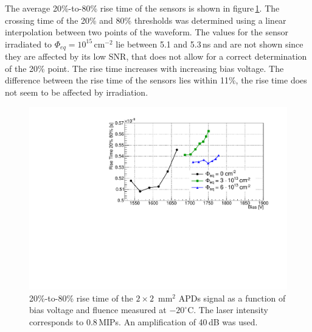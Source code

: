 \documentclass[review,number,sort&compress]{elsarticle}
\begin{document}
The average 20\%-to-80\% rise time of the sensors is shown in figure\,\ref{fig:riseTime2x2}.
The crossing time of the 20\% and 80\% thresholds was determined using a linear interpolation between two points of the waveform.
The values for the sensor irradiated to $\Phi_{eq} = 10^{15}$\,cm$^{-2}$ lie between 5.1 and 5.3\,ns and are not shown since they are affected by its low SNR, that does not allow for a correct determination of the 20\% point.
The rise time increases with increasing bias voltage.
The difference between the rise time of the sensors lies within 11\%, the rise time does not seem to be affected by irradiation.

\begin{figure}
  \centering
  \includegraphics[width = 0.6 \columnwidth]{riseTime2x2APDsNo1e15}
  \caption{20\%-to-80\% rise time of the $2 \times 2$~mm$^2$ APDs signal as a function of bias voltage and fluence measured at $-20^\circ$C. The laser intensity corresponds to 0.8\,MIPs. An amplification of 40\,dB was used.}
  \label{fig:riseTime2x2}
\end{figure}
\end{document}
